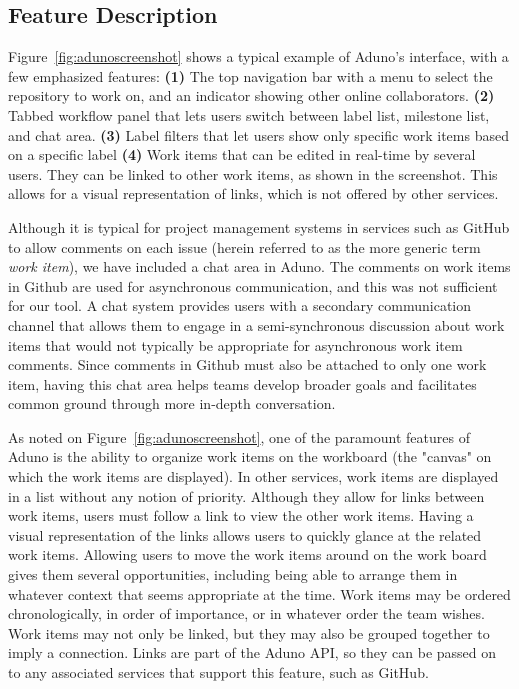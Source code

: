 \documentclass[conference]{IEEEtran}
\begin{document}
\subsection{Feature Description}
Figure~\ref{fig:adunoscreenshot} shows a typical example of Aduno's interface, with a few emphasized features: {\bf (1)} The top navigation bar with a menu to select the repository to work on, and an indicator showing other online collaborators. {\bf (2)} Tabbed workflow panel that lets users switch between label list, milestone list, and chat area. {\bf (3)} Label filters that let users show only specific work items based on a specific label {\bf (4)} Work items that can be edited in real-time by several users. They can be linked to other work items, as shown in the screenshot. This allows for a visual representation of links, which is not offered by other services.

Although it is typical for project management systems in services such as GitHub to allow comments on each issue (herein referred to as the more generic term \textit{work item}), we have included a chat area in Aduno. The comments on work items in Github are used for asynchronous communication, and this was not sufficient for our tool. A chat system provides users with a secondary communication channel that allows them to engage in a semi-synchronous discussion about work items that would not typically be appropriate for asynchronous work item comments. Since comments in Github must also be attached to only one work item, having this chat area helps teams develop broader goals and facilitates common ground through more in-depth conversation.

As noted on Figure~\ref{fig:adunoscreenshot}, one of the paramount features of Aduno is the ability to organize work items on the workboard (the "canvas" on which the work items are displayed). In other services, work items are displayed in a list without any notion of priority. Although they allow for links between work items, users must follow a link to view the other work items. Having a visual representation of the links allows users to quickly glance at the related work items. Allowing users to move the work items around on the work board gives them several opportunities, including being able to arrange them in whatever context that seems appropriate at the time. Work items may be ordered chronologically, in order of importance, or in whatever order the team wishes. Work items may not only be linked, but they may also be grouped together to imply a connection. Links are part of the Aduno API, so they can be passed on to any associated services that support this feature, such as GitHub.
\end{document}
